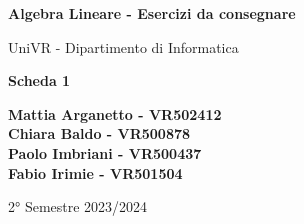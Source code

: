 \begin{titlepage}
	\begin{center}
		\vspace*{1cm}

		\Huge
		\textbf{Algebra Lineare - Esercizi da consegnare}

		\vspace{0.5cm}
		\LARGE
		UniVR - Dipartimento di Informatica

		\vspace{1cm}
		\huge
		\textbf{Scheda 1}
		\vspace{1.5cm}


		\vfill


		\vspace{0.8cm}

		\Large
		\textbf{Mattia Arganetto - VR502412}\\
		\textbf{Chiara Baldo - VR500878}\\
		\textbf{Paolo Imbriani - VR500437}\\
		\textbf{Fabio Irimie - VR501504}

		\vspace{0.5cm}

		2° Semestre 2023/2024

	\end{center}
\end{titlepage}
